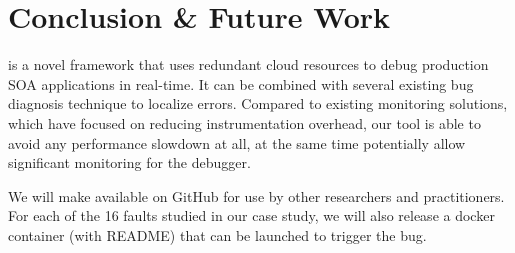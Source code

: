 

\section{Conclusion \& Future Work}
\label{sec:conclusion}

\parikshan is a novel framework that uses redundant cloud resources to debug production SOA applications in real-time.
It can be combined with several existing bug diagnosis technique to localize errors.
Compared to existing monitoring solutions, which have focused on reducing instrumentation overhead, our tool is able to avoid any performance slowdown at all, at the same time potentially allow significant monitoring for the debugger.

We will make \parikshan available on GitHub for use by other researchers and practitioners.
For each of the 16 faults studied in our case study, we will also release a docker container (with README) that can be launched to trigger the bug.

